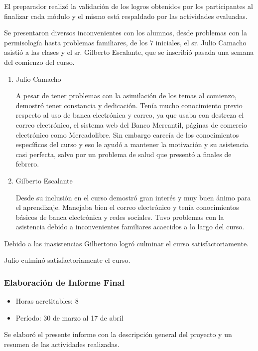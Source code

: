                 El preparador realizó la validación de los logros obtenidos por los participantes al finalizar cada módulo y el mismo está respaldado por las actividades evaluadas.
                
                Se presentaron diversos inconvenientes con los alumnos, desde problemas con la permisología hasta problemas familiares, de los 7 iniciales, el sr. Julio Camacho asistió a las clases y el sr. Gilberto Escalante, que se inscribió pasada una semana del comienzo del curso.
                
                \begin{enumerate}
                    \item Julio Camacho
                    
                    A pesar de tener problemas con la asimilación de los temas al comienzo, demostró tener constancia y dedicación. Tenía mucho conocimiento previo respecto al uso de banca electrónica y correo, ya que usaba con destreza el correo electrónico, el sistema web del Banco Mercantil, páginas de comercio electrónico como Mercadolibre. Sin embargo carecía de los conocimientos específicos del curso y eso le ayudó a mantener la motivación y su asistencia casi perfecta, salvo por un problema de salud que presentó a finales de febrero.
                    
                    \item Gilberto Escalante
                    
                    Desde su inclusión en el curso demostró gran interés y muy buen ánimo para el aprendizaje. Manejaba bien el correo electrónico y tenía conocimientos básicos de banca electrónica y redes sociales. Tuvo problemas con la asistencia debido a inconvenientes familiares acaecidos a lo largo del curso.
                    
                \end{enumerate}
                
                Debido a las inasistencias Gilbertono logró culminar el curso satisfactoriamente.
                
                Julio culminó satisfactoriamente el curso.
                
             \subsubsection {Elaboración de Informe Final}
             \begin{itemize}
                 \item Horas acretitables: 8
                 \item Período: 30 de marzo al 17 de abril
                \end{itemize}
                
                Se elaboró el presente informe con la descripción general del proyecto y un resumen de las actividades realizadas.

	\pagebreak
	
